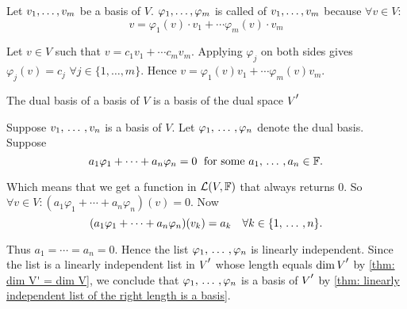 \setcounter{thm}{113}
\begin{thm}
  Let $v_1, \dots, v_m$ be a basis of $V$. $\varphi_1, \dots, \varphi_m$ is called  of $v_1, \dots, v_m$ because $\forall v \in V$:
  \begin{equation}
    v=\varphi_1 (v)\cdot v_1 + \cdots \varphi_m(v)\cdot v_m
  \end{equation}
\end{thm}
\begin{prf}
  Let $v \in V$ such that $v= c_1v_1 + \cdots c_mv_m$. Applying
  $\varphi_j$ on both sides gives $\varphi_j(v)=c_j$ $\forall j\in \{1, \dots, m\}$. Hence
  $v=\varphi_1 (v)v_1 + \cdots \varphi_m(v)v_m$.
\end{prf}

\setcounter{thm}{115}
\begin{thm}
  The dual basis of a basis of $V$ is a basis of the dual space $\dual{V}$
\end{thm}
\begin{prf}
  Suppose $v_1, {\, \ldots \,\,}, v_n$ is a basis of $V$. Let $\varphi_1, {\, \ldots \,\,}, \varphi_n$ denote the dual basis. Suppose
  \[
    a_1 \varphi_1 + \cdots + a_n \varphi_n = 0 \; $ for some $ a_1, \ddd, a_n \in \myF.
  \]

  Which means that we get a function in $\mathcal{L}(V, \mathbb{F})$ that always returns $0$. So $\forall v \in V: (a_1 \varphi_1 + \cdots + a_n \varphi_n)(v)=0$. Now
  \[
    (a_1 \varphi_1 + \cdots + a_n \varphi_n)(v_k)=a_k \quad \forall k \in \{1, {\, \ldots \,\,}, n\}.
  \]

  Thus $a_1 = \cdots = a_n = 0$. Hence the list $\varphi_1, {\, \ldots \,\,}, \varphi_n$ is linearly independent. Since the list is a linearly independent list in $\dual{V}$ whose length equals $\dim \dual{V}$ by \ref{thm: dim V' = dim V}, we conclude that $\varphi_1, {\, \ldots \,\,}, \varphi_n$ is a basis of $\dual{V}$ by \ref{thm: linearly independent list of the right length is a basis}.
\end{prf}

